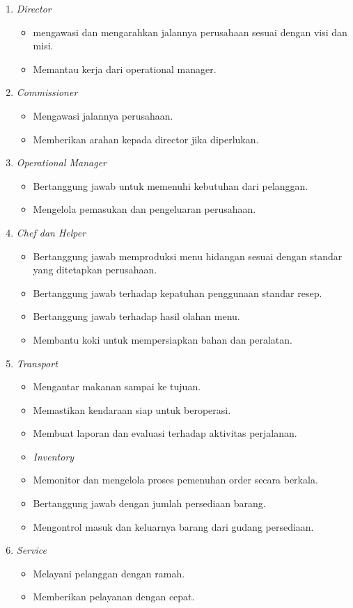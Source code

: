 \begin{enumerate}
    \item  \emph{Director}
        \begin{itemize}
        \item mengawasi dan mengarahkan jalannya perusahaan sesuai dengan visi dan misi.
        \item Memantau kerja dari operational manager.
        \end{itemize}
    \item \emph{Commissioner} 
        \begin{itemize}
        \item Mengawasi jalannya perusahaan.
        \item Memberikan arahan kepada director jika diperlukan.
        \end{itemize}
    \item \emph{Operational Manager}
        \begin{itemize}
        \item Bertanggung jawab untuk memenuhi kebutuhan dari pelanggan.
        \item Mengelola pemasukan dan pengeluaran perusahaan.
        \end{itemize}
    \item \emph{Chef dan Helper}
        \begin{itemize} 
        \item Bertanggung jawab memproduksi menu hidangan sesuai dengan standar yang ditetapkan perusahaan.
        \item Bertanggung jawab terhadap kepatuhan penggunaan standar resep.
        \item Bertanggung jawab terhadap hasil olahan menu.
        \item Membantu koki untuk mempersiapkan bahan dan peralatan.
        \end{itemize}
    \item \emph{Transport}
        \begin{itemize} 
        \item Mengantar makanan sampai ke tujuan.
        \item Memastikan kendaraan siap untuk beroperasi.
        \item Membuat laporan dan evaluasi terhadap aktivitas perjalanan.
        \item \emph{Inventory} 
        \item Memonitor dan mengelola proses pemenuhan order secara berkala.
        \item Bertanggung jawab dengan jumlah persediaan barang.
        \item Mengontrol masuk dan keluarnya barang dari gudang persediaan.
        \end{itemize}
    \item \emph{Service}
    \begin{itemize}
    \item Melayani pelanggan dengan ramah.
    \item Memberikan pelayanan dengan cepat.
    \end{itemize}
\end{enumerate}

